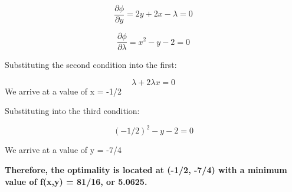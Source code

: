 \documentclass[
]{article}
\begin{document}
\[ \frac{\partial \phi}{\partial y} = 2y + 2x -\lambda = 0 \]

\[ \frac{\partial \phi}{\partial \lambda} = x^2 - y -2 = 0\]

Substituting the second condition into the first:

\[\lambda + 2\lambda x = 0\] We arrive at a value of x = -1/2

Substituting into the third condition:

\[ (-1/2)^2 - y - 2 = 0\]

We arrive at a value of y = -7/4

\textbf{Therefore, the optimality is located at (-1/2, -7/4) with a
minimum value of f(x,y) = 81/16, or 5.0625.}
\end{document}
